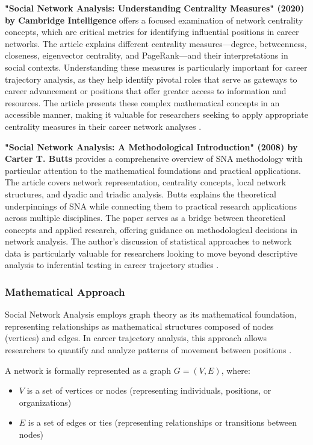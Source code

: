 \documentclass[../main.tex]{subfiles}
\begin{document}
\textbf{"Social Network Analysis: Understanding Centrality Measures" (2020) by Cambridge Intelligence} offers a focused examination of network centrality concepts, which are critical metrics for identifying influential positions in career networks. The article explains different centrality measures—degree, betweenness, closeness, eigenvector centrality, and PageRank—and their interpretations in social contexts. Understanding these measures is particularly important for career trajectory analysis, as they help identify pivotal roles that serve as gateways to career advancement or positions that offer greater access to information and resources. The article presents these complex mathematical concepts in an accessible manner, making it valuable for researchers seeking to apply appropriate centrality measures in their career network analyses \citep{cambridge_intelligence_centrality}.

\textbf{"Social Network Analysis: A Methodological Introduction" (2008) by Carter T. Butts} provides a comprehensive overview of SNA methodology with particular attention to the mathematical foundations and practical applications. The article covers network representation, centrality concepts, local network structures, and dyadic and triadic analysis. Butts explains the theoretical underpinnings of SNA while connecting them to practical research applications across multiple disciplines. The paper serves as a bridge between theoretical concepts and applied research, offering guidance on methodological decisions in network analysis. The author's discussion of statistical approaches to network data is particularly valuable for researchers looking to move beyond descriptive analysis to inferential testing in career trajectory studies \citep{butts_methodological_2008}.

\subsubsection{Mathematical Approach}

Social Network Analysis employs graph theory as its mathematical foundation, representing relationships as mathematical structures composed of nodes (vertices) and edges. In career trajectory analysis, this approach allows researchers to quantify and analyze patterns of movement between positions \citep{wikipedia_sna}.


A network is formally represented as a graph \(G = (V, E)\), where:
\begin{itemize}
\item \(V\) is a set of vertices or nodes (representing individuals, positions, or organizations)
\item \(E\) is a set of edges or ties (representing relationships or transitions between nodes)
\end{itemize}
\end{document}
